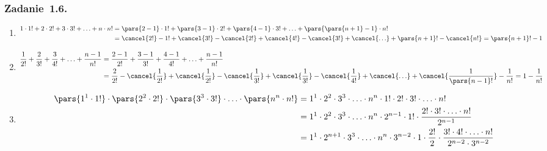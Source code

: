 \subsubsection*{Zadanie~1.6.}
\begin{enumerate}[label={\alph*)}]
    \item
        \begin{equation*}
            \begin{split}
                1 \cdot 1! + 2 \cdot 2! + 3 \cdot 3! + \ldots + n \cdot n!
                    &= \pars{2 - 1} \cdot 1! + \pars{3 - 1} \cdot 2! + \pars{4 - 1} \cdot 3! + \ldots + \pars{\pars{n + 1} - 1} \cdot n!\\
                    &= \cancel{2!} - 1! + \cancel{3!} - \cancel{2!} + \cancel{4!} - \cancel{3!} + \cancel{\ldots} + \pars{n + 1}! - \cancel{n!}
                    = \pars{n + 1}! - 1
            \end{split}
        \end{equation*}
    \item
        \begin{equation*}
            \begin{split}
                \frac{1}{2!} + \frac{2}{3!} + \frac{3}{4!} + \ldots + \frac{n - 1}{n!}
                    &= \frac{2 - 1}{2!} + \frac{3 - 1}{3!} + \frac{4 - 1}{4!} + \ldots + \frac{n - 1}{n!}\\
                    &= \frac{2}{2!} - \cancel{\frac{1}{2!}} + \cancel{\frac{1}{2!}} - \cancel{\frac{1}{3!}} + \cancel{\frac{1}{3!}} - \cancel{\frac{1}{4!}} + \cancel{\ldots} + \cancel{\frac{1}{\pars{n - 1}!}} - \frac{1}{n!}
                    = 1 - \frac{1}{n!}
            \end{split}
        \end{equation*}
    \item
        \begin{equation*}
            \begin{split}
                \pars{1^1 \cdot 1!} \cdot \pars{2^2 \cdot 2!} \cdot \pars{3^3 \cdot 3!} \cdot \ldots \cdot \pars{n^n \cdot n!}
                    &= 1^1 \cdot 2^2 \cdot 3^3 \cdot \ldots \cdot n^n \cdot 1! \cdot 2! \cdot 3! \cdot \ldots \cdot n!\\
                    &= 1^1 \cdot 2^2 \cdot 3^3 \cdot \ldots \cdot n^n \cdot 2^{n - 1} \cdot 1! \cdot \frac{2! \cdot 3! \cdot \ldots \cdot n!}{2^{n - 1}}\\
                    &= 1^1 \cdot 2^{n + 1} \cdot 3^3 \cdot \ldots \cdot n^n \cdot 3^{n - 2} \cdot  1 \cdot \frac{2!}{2} \cdot \frac{3! \cdot 4! \cdot \ldots \cdot n!}{2^{n - 2} \cdot 3^{n - 2}}\\

\end{split}
\end{equation*}
\end{enumerate}
